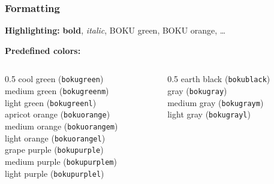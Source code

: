 \documentclass[
    11pt,
    t,
    usepdftitle=false,
    aspectratio=169,
]{beamer}
\renewcommand{\*}{\mathrm}
\begin{document}
\begin{frame}[fragile]
\frametitle{Formatting}

   \textbf{Highlighting:} \textbf{bold}, \textit{italic}, {\color{bokugreen} BOKU green}, {\color{bokuorange} BOKU orange}, \dots

   \bigskip
   
   \textbf{Predefined colors:}
   
   \smallskip

   \begin{columns}
   \begin{column}{0.5\textwidth}
    \quad cool green (\verb|bokugreen|) \\[1mm]
    \quad medium green (\verb|bokugreenm|) \\[1mm]
    \quad light green (\verb|bokugreenl|) \\[1mm]
    \quad apricot orange (\verb|bokuorange|) \\[1mm]
    \quad medium orange (\verb|bokuorangem|) \\[1mm]
    \quad light orange (\verb|bokuorangel|) \\[1mm]
    \quad grape purple (\verb|bokupurple|) \\[1mm]
    \quad medium purple (\verb|bokupurplem|) \\[1mm]
    \quad light purple (\verb|bokupurplel|) \\[1mm]
   \end{column}
   \begin{column}{0.5\textwidth}
    \quad earth black (\verb|bokublack|) \\[1mm]
    \quad gray (\verb|bokugray|) \\[1mm]
    \quad medium gray (\verb|bokugraym|) \\[1mm]
    \quad light gray (\verb|bokugrayl|)
   \end{column}
   \end{columns}

\end{frame}
\end{document}
